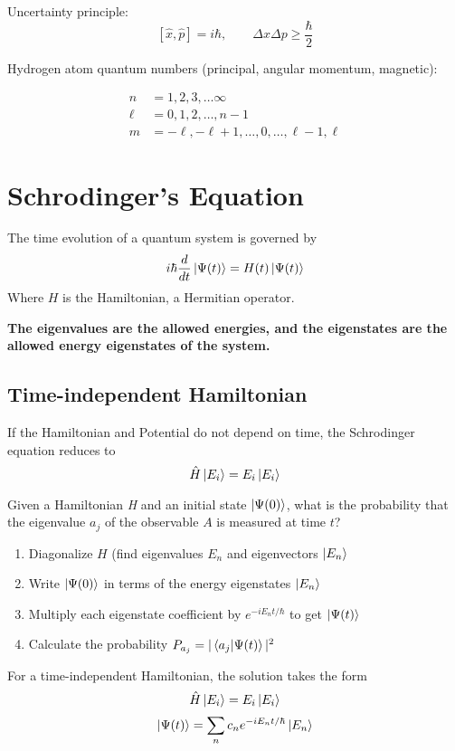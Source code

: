 \documentclass{article}
\begin{document}
Uncertainty principle:
$$
[\hat{x},\hat{p}] = i\hbar , \qquad \Delta x \Delta p \geq \frac{\hbar}{2}
$$

Hydrogen atom quantum numbers (principal, angular momentum, magnetic):
\begin{center}
    \begin{align*}
        n & = 1, 2, 3, \dots \infty \\
        \ell & = 0, 1, 2, \dots, n - 1 \\
        m & = -\ell, -\ell + 1, \dots, 0, \dots, \ell -1, \ell
    \end{align*}
\end{center}


\section{Schrodinger's Equation}
The time evolution of  a quantum system is governed by
$$
  i \hbar \frac{d}{dt} \ket{\Psi(t)} = H(t) \ket{\Psi(t)}
$$
Where $H$ is the Hamiltonian, a Hermitian operator.

\textbf{The eigenvalues are the allowed energies, and the eigenstates are the allowed energy eigenstates of the system.}

\subsection{Time-independent Hamiltonian}
If the Hamiltonian and Potential do not depend on time, the Schrodinger equation reduces to
$$
  \hat{H}\ket{E_i} = E_i\ket{E_i}
$$


Given a Hamiltonian \textit{H} and an initial state $\ket{\Psi(0)}$, what is the probability that the eigenvalue $a_j$ of the observable $A$ is measured at time $t$?

\begin{enumerate}
  \item Diagonalize $H$ (find eigenvalues $E_n$ and eigenvectors $\ket{E_n}$
  \item Write $\ket{\Psi(0)}$ in terms of the energy eigenstates $\ket{E_n}$
  \item Multiply each eigenstate coefficient by $e^{-i E_n t / \hbar}$ to get $\ket{\Psi(t)}$
  \item Calculate the probability $P_{a_j} = |\braket{a_j | \Psi(t)}|^2$
\end{enumerate}

For a time-independent Hamiltonian, the solution takes the form
$$
  \hat{H}\ket{E_i} = E_i \ket{E_i}
$$
$$
  \ket{\Psi(t)} = \sum_n c_n e^{-iE_n t/\hbar}\ket{E_n}
$$
\end{document}
